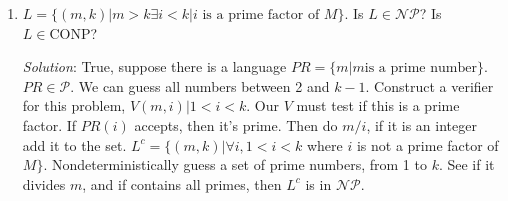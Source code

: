 \documentclass[]{article}
\begin{document}
\begin{enumerate}
\item $L = \{(m, k)|m > k \exists i < k | i \,\,\text{is a prime factor of}\,\,M \}$. Is $L \in \mathcal{NP}$? Is $L\in\text{CONP}$?
\item[\emph{Solution}:] True, suppose there is a language $PR = \{ m | m \text{is a prime number}\}$. $PR \in \mathcal{P}$. We can guess all numbers between 2 and $k - 1$. Construct a verifier for this problem, $V(m, i)| 1 < i < k$. Our $V$ must test if this is a prime factor. If $PR(i)$ accepts, then it's prime. Then do $m/i$, if it is an integer add it to the set. $L^c = \{ (m,k)|\forall i, 1 < i < k$ where $i$ is not a prime factor of $M \}$. Nondeterministically guess a set of prime numbers, from 1 to $k$. See if it divides $m$, and if contains all primes, then $L^c$ is in $\mathcal{NP}$.
\end{enumerate}
\end{document}
